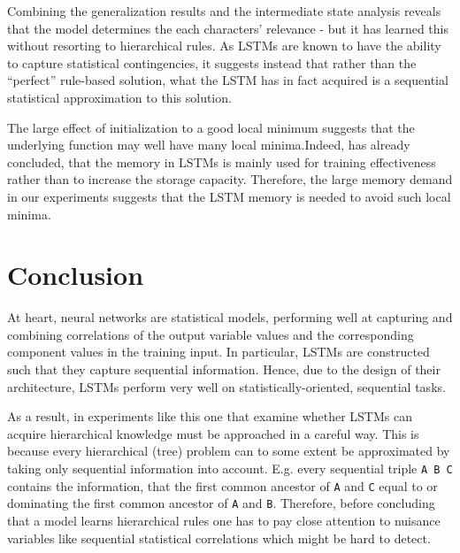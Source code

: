 \documentclass[11pt,a4paper]{article}
\begin{document}
Combining the generalization results and the intermediate state analysis reveals that the model determines the each characters' relevance - but it has learned this without resorting to hierarchical rules. As LSTMs are known to have the ability to capture statistical contingencies, it suggests instead that rather than the ``perfect'' rule-based solution, what the LSTM has in fact acquired is a sequential statistical approximation to this solution.

The large effect of initialization to a good local minimum suggests that the underlying function may well have many local minima.Indeed, \citeauthor{collins2016capacity}  has already concluded, that the memory in LSTMs is mainly used for training effectiveness rather than to increase the storage capacity. Therefore, the large memory demand in our experiments suggests that the LSTM memory is needed to avoid such local minima.

\section{Conclusion}

At heart, neural networks are statistical models, performing well at capturing and combining correlations of the output variable values and the corresponding component values in the training input. In particular, LSTMs are constructed such that they capture sequential information. Hence, due to the design of their architecture, LSTMs perform very well on statistically-oriented, sequential tasks. 

As a result, in experiments like this one that examine whether LSTMs can acquire hierarchical knowledge must be approached in a careful way.  This is because every hierarchical (tree) problem can to some extent be approximated by taking only sequential information into account. E.g. every sequential triple \verb|A B C| contains the information, that the first common ancestor of \verb|A| and \verb|C| equal to or dominating the first common ancestor of \verb|A| and \verb|B|.
Therefore, before concluding that a model learns hierarchical rules one has to pay close attention to nuisance variables like sequential statistical correlations which might be hard to detect.
\end{document}
